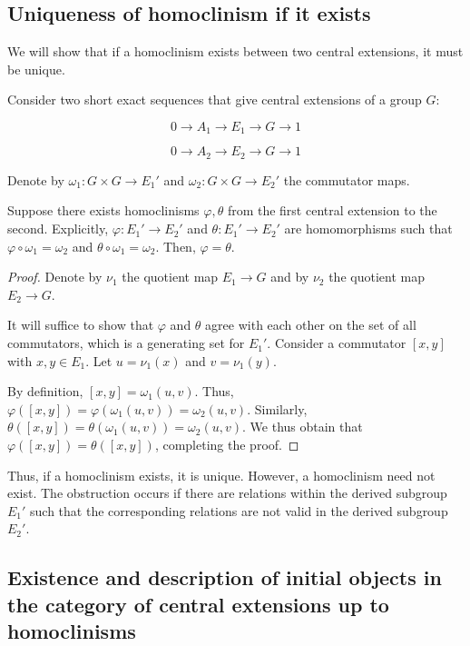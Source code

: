 \documentclass{ucetd}
\begin{document}
\subsection{Uniqueness of homoclinism if it exists}

We will show that if a homoclinism exists between two central
extensions, it must be unique.

\begin{lemma}\label{lemma:uniqueness-of-homoclinism}
  Consider two short exact sequences that give central extensions of a group $G$:

  $$0 \to A_1 \to E_1 \to G \to 1$$

  $$0 \to A_2 \to E_2 \to G \to 1$$

  Denote by $\omega_1:G \times G \to E_1'$ and $\omega_2:G \times G
  \to E_2'$ the commutator maps.

  Suppose there exists homoclinisms $\varphi,\theta$ from the first
  central extension to the second. Explicitly, $\varphi:E_1' \to E_2'$
  and $\theta:E_1' \to E_2'$ are homomorphisms such that $\varphi
  \circ \omega_1 = \omega_2$ and $\theta \circ \omega_1 =
  \omega_2$. Then, $\varphi = \theta$.
\end{lemma}

\begin{proof}
  Denote by $\nu_1$ the quotient map $E_1 \to G$ and by $\nu_2$ the
  quotient map $E_2 \to G$.

  It will suffice to show that $\varphi$ and $\theta$ agree with each
  other on the set of all commutators, which is a generating set for
  $E_1'$. Consider a commutator $[x,y]$ with $x,y \in E_1$. Let $u =
  \nu_1(x)$ and $v = \nu_1(y)$. 

  By definition, $[x,y] = \omega_1(u,v)$. Thus, $\varphi([x,y]) =
  \varphi(\omega_1(u,v)) = \omega_2(u,v)$. Similarly, $\theta([x,y]) =
  \theta(\omega_1(u,v)) = \omega_2(u,v)$. We thus obtain that
  $\varphi([x,y]) = \theta([x,y])$, completing the proof.
\end{proof}

Thus, if a homoclinism exists, it is unique. However, a homoclinism
need not exist. The obstruction occurs if there are relations within
the derived subgroup $E_1'$ such that the corresponding relations are
not valid in the derived subgroup $E_2'$.

\subsection{Existence and description of initial objects in the category of central extensions up to homoclinisms}
\end{document}
